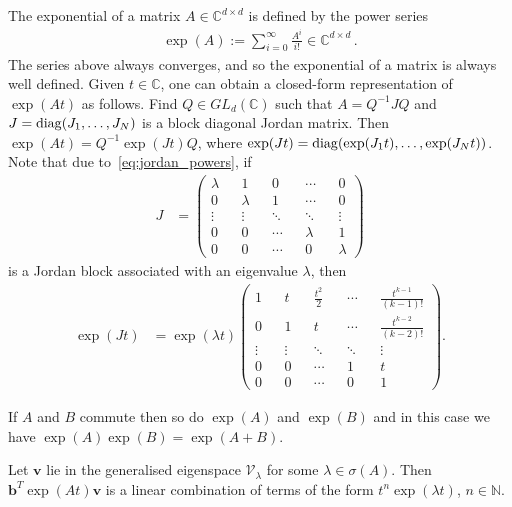 \documentclass[format=acmsmall, review=false, screen=true]{acmart}
\DeclarePairedDelimiter{\diagfences}{(}{)}
\newcommand{\diag}{\operatorname{diag}\diagfences}
\newcommand{\Complex}{\mathbb{C}}
\newcommand{\myvector}{\boldsymbol}
\begin{document}
The exponential of a matrix $A \in \Complex^{d \times d}$ is defined
by the power series
\begin{align*}
\exp(A) := \sum \limits_{i=0}^{\infty} \frac{A^{i}}{i!} \in \Complex^{d \times d} \, .
\end{align*}
The series above always converges, and so the exponential of a matrix
is always well defined.  Given $t\in\mathbb{C}$,
one can obtain a closed-form representation of $\exp(At)$ as follows.
Find $Q \in \mathit{GL}_{d}(\Complex)$ such that 
$A=Q^{-1}JQ$ and 
$J=\diag{J_{1},\ldots,J_{N}}$ is a block diagonal Jordan matrix.
Then $\exp(At)=Q^{-1}\exp(Jt)Q$, where $\exp(Jt)=\diag{\exp(J_{1}t),\ldots,\exp(J_{N}t)}$.
Note that due to~\cref{eq:jordan_powers}, if
\begin{align*}
J &= \begin{pmatrix}
\lambda && 1 && 0 && \cdots && 0 \\
0 && \lambda && 1 &&\cdots && 0 \\
\vdots && \vdots && \ddots && \ddots && \vdots \\
0 && 0 && \cdots && \lambda && 1 \\
0 && 0 && \cdots && 0 && \lambda
\end{pmatrix}
\end{align*}
is a Jordan block associated with an eigenvalue $\lambda$, then
\begin{align*}
\exp(Jt) &= \exp(\lambda t) \begin{pmatrix}
1 && t && \frac{t^{2}}{2} && \cdots && \frac{t^{k-1}}{(k-1)!} \\
0 && 1 && t && \cdots && \frac{t^{k-2}}{(k-2)!} \\
\vdots && \vdots &&\ddots && \ddots && \vdots \\
0 && 0 && \cdots && 1 && t \\
0 && 0 && \cdots && 0 && 1
\end{pmatrix} .
\end{align*}

If $A$ and $B$ commute then so do $\exp(A)$ and $\exp(B)$ and in this
case we have $\exp{(A)}\exp{(B)} = \exp{(A+B)}$.

\begin{proposition}
  Let $\myvector{v}$ lie in the generalised eigenspace
  $\mathcal{V}_{\lambda}$ for some $\lambda \in \sigma(A)$.  Then
  $\myvector{b}^{T}\exp(At)\myvector{v}$ is a linear combination
  of terms of the form $t^{n}\exp(\lambda t)$, $n \in \mathbb{N}$.
\label{prop:linear}
\end{proposition}
\end{document}
